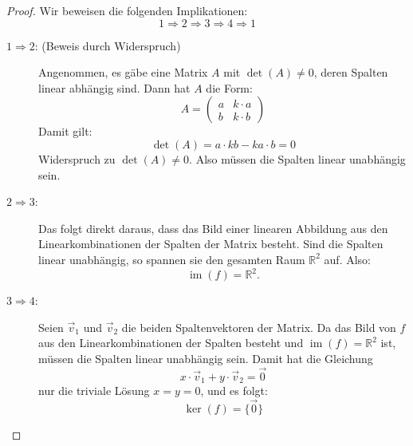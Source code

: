 \begin{proof}
    

Wir beweisen die folgenden Implikationen:  
\[
1 \Rightarrow 2 \Rightarrow 3 \Rightarrow 4 \Rightarrow 1
\]

\begin{description}
  \item[\(1 \Rightarrow 2\): (Beweis durch Widerspruch)]
  Angenommen, es gäbe eine Matrix \( A \) mit \( \det(A) \neq 0 \), deren Spalten linear abhängig sind.  
  Dann hat \( A \) die Form:
  \[
  A = \begin{pmatrix} a & k \cdot a \\ b & k \cdot b \end{pmatrix}
  \]
  Damit gilt:
  \[
  \det(A) = a \cdot k b - k a \cdot b = 0
  \]
  Widerspruch zu \( \det(A) \neq 0 \). Also müssen die Spalten linear unabhängig sein.

  \item[\(2 \Rightarrow 3\):]  
  Das folgt direkt daraus, dass das Bild einer linearen Abbildung aus den Linearkombinationen der Spalten der Matrix besteht.  
  Sind die Spalten linear unabhängig, so spannen sie den gesamten Raum \( \mathbb{R}^2 \) auf. Also:
  \[
  \operatorname{im}(f) = \mathbb{R}^2.
  \]

  \item[\(3 \Rightarrow 4\):]  
  Seien \( \vec{v}_1 \) und \( \vec{v}_2 \) die beiden Spaltenvektoren der Matrix.  
  Da das Bild von \( f \) aus den Linearkombinationen der Spalten besteht und \( \operatorname{im}(f) = \mathbb{R}^2 \) ist, müssen die Spalten linear unabhängig sein.  
  Damit hat die Gleichung
  \[
  x \cdot \vec{v}_1 + y \cdot \vec{v}_2 = \vec{0}
  \]
  nur die triviale Lösung \( x = y = 0 \), und es folgt:
  \[
  \ker(f) = \{ \vec{0} \}
  \]


\end{description}
\end{proof}
